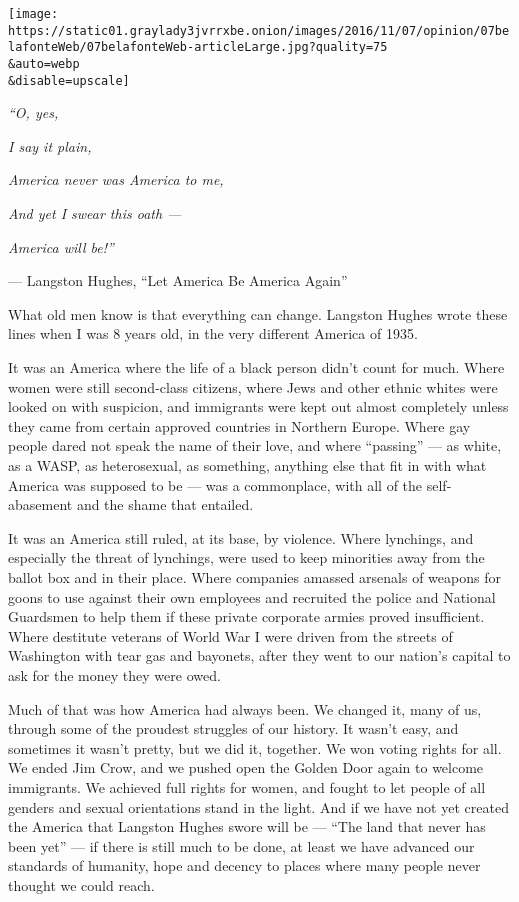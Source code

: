 \texttt{[image: https://static01.graylady3jvrrxbe.onion/images/2016/11/07/opinion/07belafonteWeb/07belafonteWeb-articleLarge.jpg?quality=75\\\&auto=webp\\\&disable=upscale]}

\emph{``O, yes,}

\emph{I say it plain,}

\emph{America never was America to me,}

\emph{And yet I swear this oath ---}

\emph{America will be!''}

--- Langston Hughes, ``Let America Be America Again''

What old men know is that everything can change. Langston Hughes wrote
these lines when I was 8 years old, in the very different America of
1935.

It was an America where the life of a black person didn't count for
much. Where women were still second-class citizens, where Jews and other
ethnic whites were looked on with suspicion, and immigrants were kept
out almost completely unless they came from certain approved countries
in Northern Europe. Where gay people dared not speak the name of their
love, and where ``passing'' --- as white, as a WASP, as heterosexual, as
something, anything else that fit in with what America was supposed to
be --- was a commonplace, with all of the self-abasement and the shame
that entailed.

It was an America still ruled, at its base, by violence. Where
lynchings, and especially the threat of lynchings, were used to keep
minorities away from the ballot box and in their place. Where companies
amassed arsenals of weapons for goons to use against their own employees
and recruited the police and National Guardsmen to help them if these
private corporate armies proved insufficient. Where destitute veterans
of World War I were driven from the streets of Washington with tear gas
and bayonets, after they went to our nation's capital to ask for the
money they were owed.

Much of that was how America had always been. We changed it, many of us,
through some of the proudest struggles of our history. It wasn't easy,
and sometimes it wasn't pretty, but we did it, together. We won voting
rights for all. We ended Jim Crow, and we pushed open the Golden Door
again to welcome immigrants. We achieved full rights for women, and
fought to let people of all genders and sexual orientations stand in the
light. And if we have not yet created the America that Langston Hughes
swore will be --- ``The land that never has been yet'' --- if there is
still much to be done, at least we have advanced our standards of
humanity, hope and decency to places where many people never thought we
could reach.

